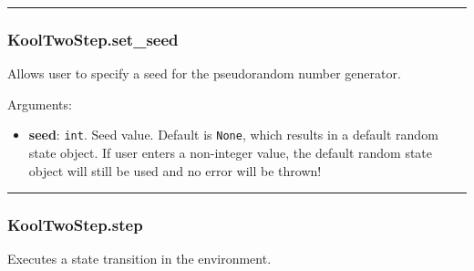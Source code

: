 \begin{Shaded}
\begin{Highlighting}[]
\OperatorTok{=}
\end{Highlighting}
\end{Shaded}

\begin{center}\rule{0.5\linewidth}{\linethickness}\end{center}

\subsubsection{KoolTwoStep.set\_seed}\label{kooltwostep.set_seed}

\begin{Shaded}
\begin{Highlighting}[]
\OperatorTok{=}\NormalTok{)}
\end{Highlighting}
\end{Shaded}

Allows user to specify a seed for the pseudorandom number generator.

Arguments:

\begin{itemize}
\tightlist
\item
  \textbf{seed}: \texttt{int}. Seed value. Default is \texttt{None},
  which results in a default random state object. If user enters a
  non-integer value, the default random state object will still be used
  and no error will be thrown!
\end{itemize}

\begin{center}\rule{0.5\linewidth}{\linethickness}\end{center}

\subsubsection{KoolTwoStep.step}\label{kooltwostep.step}

\begin{Shaded}
\begin{Highlighting}[]
\end{Highlighting}
\end{Shaded}

Executes a state transition in the environment.


